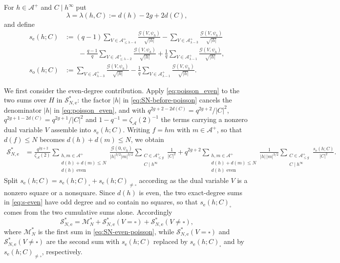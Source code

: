 \documentclass[a4paper,reqno]{amsart}
\numberwithin{equation}{section}
\theoremstyle{remark}
\theoremstyle{definition}
\newcommand{\A}{\mathcal{A}}
\newcommand{\zA}{\zeta_{\A}}
\newcommand{\Gc}{\mathcal{G}}
\begin{document}
For $h\in\A^+$ and $C\mid h^\infty$ put
\begin{equation}\label{eq:lambda-def}
\lambda=\lambda(h,C):=d(h)-2g+2d(C),
\end{equation}
and define
\begin{align}
s_{\mathrm e}(h;C)
&:=(q-1)\sum_{V\in\A^+_{\le\lambda-4}}\frac{\Gc(V,\psi_h)}{\sqrt{|h|}}
-\sum_{V\in\A^+_{\lambda-3}}\frac{\Gc(V,\psi_h)}{\sqrt{|h|}}
\nonumber\\
&\qquad
-\frac{q-1}{q}\sum_{V\in\A^+_{\le\lambda-2}}\frac{\Gc(V,\psi_h)}{\sqrt{|h|}}
+\frac{1}{q}\sum_{V\in\A^+_{\lambda-1}}\frac{\Gc(V,\psi_h)}{\sqrt{|h|}},
\label{eq:s-even}\\
s_{\mathrm o}(h;C)
&:=\sum_{V\in\A^+_{\lambda-3}}\frac{\Gc(V,\psi_h)}{\sqrt{|h|}}
-\frac{1}{q}\sum_{V\in\A^+_{\lambda-1}}\frac{\Gc(V,\psi_h)}{\sqrt{|h|}}.
\label{eq:s-odd}
\end{align}

We first consider the even-degree contribution. Apply
\eqref{eq:poisson_even} to the two sums over $H$ in
$\mathcal S_{N,\mathrm e}^*$: the factor $|h|$ in
\eqref{eq:SN-before-poisson} cancels the denominator $|h|$ in
\eqref{eq:poisson_even}, and with $q^{2g+2-2d(C)}=q^{2g+2}/|C|^2$,
$q^{2g+1-2d(C)}=q^{2g+1}/|C|^2$ and $1-q^{-1}=\zA(2)^{-1}$ the terms
carrying a nonzero dual variable $V$ assemble into $s_{\mathrm e}(h;C)$. Writing
$f=hm$ with $m\in\A^+$, so that $d(f)\le N$ becomes $d(h)+d(m)\le N$, we
obtain
\begin{align}\label{eq:SN-even-poisson}
\mathcal S_{N,\mathrm e}^*
&=
\frac{q^{2g+2}}{\zA(2)}
\sum_{\substack{h,m\in\A^+\\ d(h)+d(m)\le N\\ d(h)\text{ even}}}
\frac{\Gc(0,\psi_h)}{|h|^{3/2}|m|^{3/2}}
\sum_{\substack{C\in\A_{\le g}^+\\C\mid h^\infty}}\frac{1}{|C|^2}
+q^{2g+2}
\sum_{\substack{h,m\in\A^+\\ d(h)+d(m)\le N\\ d(h)\text{ even}}}
\frac{1}{|h|\,|m|^{3/2}}
\sum_{\substack{C\in\A_{\le g}^+\\C\mid h^\infty}}
\frac{s_{\mathrm e}(h;C)}{|C|^2}.
\end{align}
Split
$s_{\mathrm e}(h;C)=s_{\mathrm e}(h;C)_{\square}+s_{\mathrm e}(h;C)_{\ne\square}$
according as the dual variable $V$ is a nonzero square or a nonsquare.
Since
$d(h)$ is even, the two exact-degree sums in \eqref{eq:s-even} have odd
degree and so contain no squares, so that $s_{\mathrm e}(h;C)_{\square}$
comes from the two cumulative sums alone. Accordingly
\begin{equation}\label{eq:SN-even-decomposition}
\mathcal S_{N,\mathrm e}^*
=
\mathcal M_N^*
+
\mathcal S_{N,\mathrm e}^*(V=\square)
+
\mathcal S_{N,\mathrm e}^*(V\ne\square),
\end{equation}
where $\mathcal M_N^*$ is the first sum in \eqref{eq:SN-even-poisson}, while
$\mathcal S_{N,\mathrm e}^*(V=\square)$ and
$\mathcal S_{N,\mathrm e}^*(V\ne\square)$ are the second sum with
$s_{\mathrm e}(h;C)$ replaced by $s_{\mathrm e}(h;C)_{\square}$ and by
$s_{\mathrm e}(h;C)_{\ne\square}$, respectively.
\end{document}

